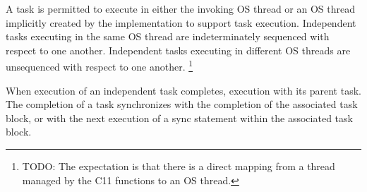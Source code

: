 
\pnum
A task is permitted to execute
in either the invoking OS thread
or an OS thread implicitly created by the implementation
to support task execution.
Independent tasks executing in the same OS thread
are indeterminately sequenced with respect to one another.
Independent tasks executing in different OS threads
are unsequenced with respect to one another.
\footnote{TODO:
The expectation is that there is a direct mapping
from a thread managed by the C11
functions to an OS thread.
}

\pnum
When execution of an independent task completes,
execution
with its parent task.
The completion of a task synchronizes
with the completion of the associated task block,
or with the next execution of a sync statement
within the associated task block.
